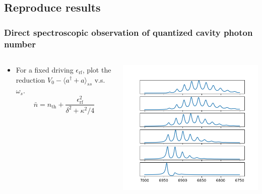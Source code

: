 \documentclass[12pt,hyperref={CJKbookmarks=true}]{beamer}
\newcommand{\rf}{\text{rf}}
\newcommand{\thm}{\text{th}}
\begin{document}
\subsection{Reproduce results}
\begin{frame}[t]\frametitle{Direct spectroscopic observation of quantized cavity photon number}
\begin{columns}
\begin{column}{0.4\linewidth}
\begin{itemize}
	\item For a fixed driving $\epsilon_{\rf}$, plot the reduction
	$V_0 - \langle a^\dag + a\rangle_{ss}$ v.s. $\omega_{s}$. 
	\begin{equation*}
		\bar n = n_{\thm} + \frac{\epsilon_{\rf}^2}{\delta^2 + \kappa^2/4}
	\end{equation*}
\end{itemize}
\end{column}%
\begin{column}{0.6\linewidth}
	\centering
    \includegraphics[width=\textwidth]{sweaping.png}
\end{column}
\end{columns}
\end{frame}
\end{document}
